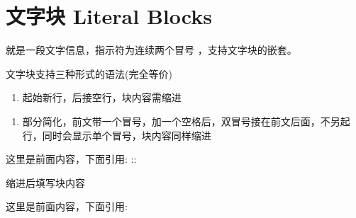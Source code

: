 \documentclass[a4paper,10pt,english]{sphinxmanual}
\begin{document}
\section{文字块 Literal Blocks}
\label{\detokenize{reStructureText_syntax:literal-blocks}}
\sphinxAtStartPar
{} 就是一段文字信息，指示符为连续两个冒号 \sphinxcode{\sphinxupquote{::}} ，支持文字块的嵌套。

\sphinxAtStartPar
文字块支持三种形式的语法(完全等价)
\begin{enumerate}
%
\item {} 
\sphinxAtStartPar
起始新行，后接空行，块内容需缩进

\end{enumerate}

\sphinxAtStartPar
{}

\begin{sphinxVerbatim}[commandchars=\\\{\}]

\end{sphinxVerbatim}

\sphinxAtStartPar
{}

\begin{sphinxVerbatim}[commandchars=\\\{\}]
\end{sphinxVerbatim}
\begin{enumerate}
%
\setcounter{enumi}{1}
\item {} 
\sphinxAtStartPar
部分简化，前文带一个冒号，加一个空格后，双冒号接在前文后面，不另起行，同时会显示单个冒号，块内容同样缩进

\end{enumerate}

\sphinxAtStartPar
{}

\begin{sphinxVerbatim}[commandchars=\\\{\}]
这里是前面内容，下面引用: ::

  缩进后填写块内容
\end{sphinxVerbatim}

\sphinxAtStartPar
{}

\sphinxAtStartPar
这里是前面内容，下面引用:
\end{document}
